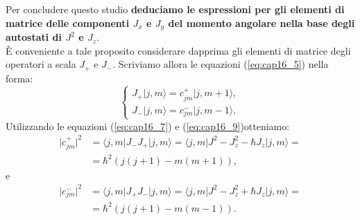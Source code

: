 \documentclass[a4paper,12pt,oneside]{book}
\begin{document}
Per concludere questo studio \textbf{deduciamo le espressioni per gli elementi di matrice delle componenti $J_x$ e $J_y$ del momento angolare nella base degli autostati di $J^2$ e $J_z$}.\\

È conveniente a tale proposito considerare dapprima gli elementi di matrice degli operatori a scala $J_+$ e $J_-$. Scriviamo allora le equazioni (\ref{eq:cap16_5}) nella forma:
	\begin{equation}
		\begin{cases}
			J_+\vert j, m \rangle = c_{jm} ^+\vert j, m+1 \rangle , \\
			J_-\vert j, m \rangle = c_{jm} ^-\vert j, m-1 \rangle ,
		\end{cases}
	\end{equation}
Utilizzando le equazioni (\ref{eq:cap16_7}) e (\ref{eq:cap16_9})otteniamo:
	\begin{align}
		\vert c_{jm} ^+\vert ^2 &= \langle j, m \vert J_- J_+\vert j, m \rangle = \langle j, m \vert J^2- J_z ^2 -\hbar J_z\vert j, m \rangle =\nonumber \\
		&= \hbar ^2 \left( j(j+1) - m (m+1)\right) ,
	\end{align}
e
	\begin{align}
		\vert c_{jm} ^-\vert ^2 &= \langle j, m \vert J_+ J_-\vert j, m \rangle = \langle j, m \vert J^2- J_z ^2 +\hbar J_z\vert j, m \rangle =\nonumber \\
		&= \hbar ^2 \left( j(j+1) - m (m-1)\right) .
	\end{align}\\
	
\end{document}
